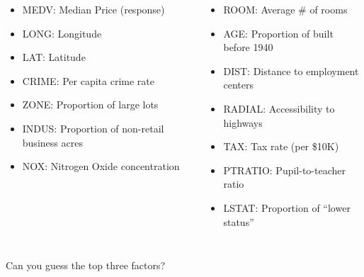 \documentclass{beamer}\usepackage[]{graphicx}\usepackage[]{color}
\makeatletter
\newcommand{\hlstr}[1]{\textcolor[rgb]{1,0.894,0.71}{#1}}%
\newcommand{\hlopt}[1]{\textcolor[rgb]{1,0.894,0.769}{#1}}%
\newcommand{\hlstd}[1]{\textcolor[rgb]{1,0.894,0.769}{#1}}%
\newcommand{\hlkwc}[1]{\textcolor[rgb]{0.78,0.941,0.545}{#1}}%
\newcommand{\hlkwd}[1]{\textcolor[rgb]{1,0.78,0.769}{#1}}%
\newenvironment{kframe}{%
 \def\at@end@of@kframe{}%
 \ifinner\ifhmode%
  \def\at@end@of@kframe{\end{minipage}}%
  \begin{minipage}{\columnwidth}%
 \fi\fi%
 \def\FrameCommand##1{\hskip\@totalleftmargin \hskip-\fboxsep
 \colorbox{shadecolor}{##1}\hskip-\fboxsep
     \hskip-\linewidth \hskip-\@totalleftmargin \hskip\columnwidth}%
 \MakeFramed {\advance\hsize-\width
   \@totalleftmargin\z@ \linewidth\hsize
   \@setminipage}}%
 {\par\unskip\endMakeFramed%
 \at@end@of@kframe}
\newenvironment{knitrout}{}{} %
\makeatother
\begin{document}
\begin{darkframes}
\begin{frame}
      \begin{columns}[onlytextwidth]
          \begin{itemize}
            \item MEDV: Median Price (response)
            \item LONG: Longitude
            \item LAT: Latitude
            \item CRIME: Per capita crime rate
            \item ZONE: Proportion of large lots
            \item INDUS: Proportion of non-retail business acres
            \item NOX: Nitrogen Oxide concentration
          \end{itemize}
          \begin{itemize}
            \item ROOM: Average \# of rooms
            \item AGE: Proportion of built before 1940
            \item DIST: Distance to employment centers
            \item RADIAL: Accessibility to highways
            \item TAX: Tax rate (per \$10K)
            \item PTRATIO: Pupil-to-teacher ratio
            \item LSTAT: Proportion of ``lower status''
          \end{itemize}
      \end{columns}
    
    \end{frame}
    
    
    
    
    
    \begin{frame}
        Can you guess the top three factors?
        \lc
    \end{frame}
    
    
    
    
\end{darkframes}
\end{document}
